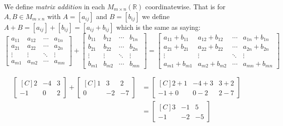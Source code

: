 \begin{definition} We define \emph{matrix addition} in each 
$M_{m\times n}(\mathbb{R})$ coordinatewise. That is for $A,B \in M_{m\times n}$
with $A=[a_{ij}]$ and $B=[b_{ij}]$ we define 
$A+B=[a_{ij}]+[b_{ij}]=[a_{ij}+b_{ij}]$ which is the same as saying:
\[
\begin{bmatrix}
a_{11} & a_{12} & \cdots & a_{1n} \\
a_{21} & a_{22} & \cdots & a_{2n} \\
\vdots & \vdots & \ddots & \vdots \\
a_{m1} & a_{m2} & \cdots & a_{mn}
\end{bmatrix}
+
\begin{bmatrix}
b_{11} & b_{12} & \cdots & b_{1n} \\
b_{21} & b_{22} & \cdots & b_{2n} \\
\vdots & \vdots & \ddots & \vdots \\
b_{m1} & b_{m2} & \cdots & b_{mn}
\end{bmatrix}
=
\begin{bmatrix}
a_{11}+b_{11} & a_{12}+b_{12} & \cdots & a_{1n}+b_{1n} \\
a_{21}+b_{21} & a_{22}+b_{22} & \cdots & a_{2n}+b_{2n} \\
\vdots        & \vdots        & \ddots & \vdots \\
a_{m1}+b_{m1} & a_{m2}+b_{m2} & \cdots & a_{mn}+b_{mn}
\end{bmatrix}
\]
\end{definition}

\begin{example}
\begin{align*}
\begin{bmatrix*}[C]
2  & -4 & 3 \\
-1 & 0  & 2
\end{bmatrix*}+
\begin{bmatrix*}[C]
1  & 3 & 2 \\
0 & -2  & -7
\end{bmatrix*}
&=\begin{bmatrix*}[C]
2+1  & -4+3 & 3+2 \\
-1+0 & 0-2  & 2-7
\end{bmatrix*}\\
&=\begin{bmatrix*}[C]
3  & -1 & 5 \\
-1 & -2  & -5
\end{bmatrix*}
\end{align*}
\end{example}

